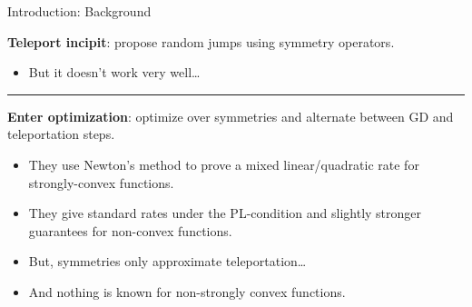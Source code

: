 \documentclass[usenames,dvipsnames,mathserif,notheorems]{beamer}
\newcommand{\horizontalrule}{
	{
			\vspace{-0.5em}
			\center \rule{\textwidth}{0.1em}
			\vspace{-0.2em}
		}
}
\newcommand{\bad}[1]{\textcolor{bad}{#1}}
\newcommand{\good}[1]{\textcolor{good}{#1}}
\begin{document}
\begin{frame}{Introduction: Background}

    \textbf{Teleport incipit}:
    \citet{armenta2020neural, armenta2021representation}
    propose \good{random jumps} using symmetry operators.

    \pause
    \vspace{1ex}

    \begin{itemize}
        \item But it \bad{doesn't work} very well\ldots
    \end{itemize}

    \pause
    \horizontalrule

    \textbf{Enter optimization}:
    \citet{zhao2023improving} \good{optimize} over symmetries and
    alternate between GD and teleportation steps.

    \pause
    \vspace{1ex}

    \begin{itemize}
        \item They use Newton's method to prove a \good{mixed linear/quadratic}
              rate for strongly-convex functions.
              \pause
              \vspace{1ex}

        \item They give standard rates under the PL-condition
              \citep{karimi2016pl} and slightly \good{stronger guarantees} for
              non-convex functions.
              \pause
              \vspace{1ex}

        \item But, symmetries only \bad{approximate teleportation}\ldots

              \pause
              \vspace{1ex}

        \item And nothing is known for \bad{non-strongly convex} functions.
              \pause
    \end{itemize}

    \vspace{2ex}

\end{frame}
\end{document}
